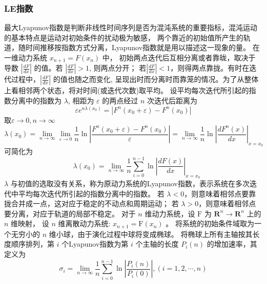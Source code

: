 \subsubsection{LE指数}
最大Lyapunov指数是判断非线性时间序列是否为混沌系统的重要指标，混沌运动的基本特点是运动对初始条件的扰动极为敏感，
两个靠近的初始值所产生的轨道，随时间推移按指数方式分离，Lyapunov指数就是用以描述这一现象的量。
在一维动力系统 $x_{n+1}=F\left(x_{n}\right)$ 中， 初始两点迭代后互相分离或者靠昽，取决于导数
$\left|\frac{d F}{d x}\right|$ 的值。若 $\left|\frac{d F}{d x}\right|>1$, 则两点分开；
若$\left|\frac{d F}{d x}\right|<1$，则得两点靠拢。有时在迭代过程中，$\left|\frac{d F}{d x}\right|$ 
的值也随之而变化, 呈现出时而分离时而靠笼的情况。为了从整体上看相邻两个状态，将对时间(或迭代次数)取平均。
设平均每次迭代所引起的指数分离中的指数为 $\lambda$, 相距为 $\varepsilon$ 的两点经过 $n$ 次迭代后距离为
\begin{equation}
    \varepsilon e^{n \lambda\left(x_{0}\right)}=\left|F^{n}\left(x_{0}+\varepsilon\right)-F^{n}\left(x_{0}\right)\right|
\end{equation}
取$\varepsilon \rightarrow 0, n \rightarrow \infty$
\begin{equation}
    \lambda\left(x_{0}\right)=\lim _{n \rightarrow \infty} \lim _{\varepsilon \rightarrow 0}
     \frac{1}{n} \ln \left|\frac{F^{n}\left(x_{0}+\varepsilon\right)-F^{n}\left(x_{0}\right)}
     {\varepsilon}\right|=\lim _{n \rightarrow \infty} \frac{1}{n} \ln \left|\frac{d F^{n}(x)}{d x}
     \right|_{x=x_{0}}
\end{equation}
可简化为
\begin{equation}
    \quad \lambda\left(x_{0}\right)=\lim _{n \rightarrow \infty} \frac{1}{n} \sum_{i=0}^{n-1} \ln \left|\frac{d F(x)}{d x}\right|_{x=x_{0}}
\end{equation} 
$\lambda$ 与初值的选取没有关系，称为原动力系统的Lyapunov指数，表示系统在多次迭代中平均每次迭代所引起的指数分离中的指数。
若 $\lambda<0$，则意味着相邻点要靠拢合并成一点，这对应于稳定的不动点和周期运动；
若 $\lambda>0$，则意味着相邻点要分离，对应于轨道的局部不稳定。
对于 $n$ 维动力系统，设 $\mathrm{F}$ 为 $\mathbf{R}^{n} \rightarrow \mathbf{R}^{n}$ 上的 $n$ 维映射，
设 $n$ 维离散动力系统: $x_{n+1}=\mathrm{F}\left(x_{n}\right)$ 。
将系统的初始条件域取为一个无穷小的 $n$ 维小球，由于演化过程中球将变成椭球。
将椭球上所有主轴按其长度顺序排列，第 $i$ 个Lyapunov指数为第 $i$ 个主轴的长度 $P_{i}(n)$ 的增加速率，其定义为
\begin{equation}
    \sigma_{i}=\lim _{n \rightarrow \infty} \frac{1}{n} \sum_{i=0}^{n-1} \ln \left|\frac{P_{i}(n)}{P_{i}(0)}\right|,(i=1,2, \cdots, n)
\end{equation}
